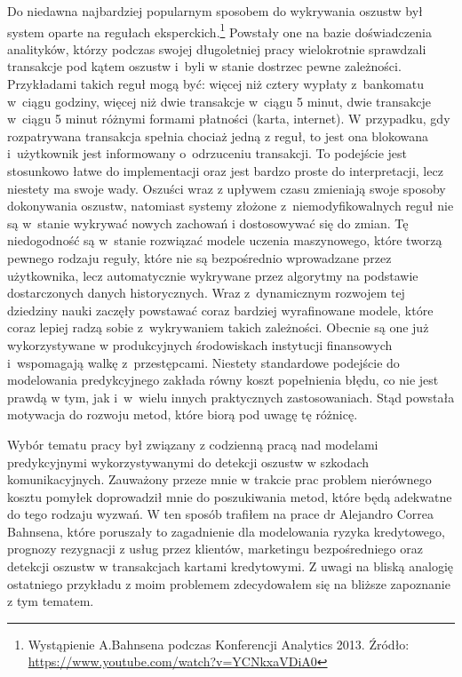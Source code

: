 \documentclass[inzynierska]{pwr_wmat_praca_dyplomowa}
\theoremstyle{plain}
\numberwithin{theorem}{chapter}
\theoremstyle{definition}
\numberwithin{theorem}{chapter}
\begin{document}
Do niedawna najbardziej popularnym sposobem do wykrywania oszustw był system oparte na regułach eksperckich.\footnote{Wystąpienie A.Bahnsena podczas Konferencji Analytics 2013. Źródło: \url{https://www.youtube.com/watch?v=YCNkxaVDiA0}} Powstały one na bazie doświadczenia analityków, którzy podczas swojej długoletniej pracy wielokrotnie sprawdzali transakcje pod kątem oszustw i~byli w stanie dostrzec pewne zależności. Przykładami takich reguł mogą być: więcej niż cztery wypłaty z~bankomatu w~ciągu godziny, więcej niż dwie transakcje w~ciągu 5 minut, dwie transakcje w~ciągu 5 minut różnymi formami płatności (karta, internet). W przypadku, gdy rozpatrywana transakcja spełnia chociaż jedną z reguł, to jest ona blokowana i~użytkownik jest informowany o~odrzuceniu transakcji. To podejście jest stosunkowo łatwe do implementacji oraz jest bardzo proste do interpretacji, lecz niestety ma swoje wady. Oszuści wraz z upływem czasu zmieniają swoje sposoby dokonywania oszustw, natomiast systemy złożone z~niemodyfikowalnych reguł nie są w~stanie wykrywać nowych zachowań i dostosowywać się do zmian. Tę niedogodność są w~stanie rozwiązać modele uczenia maszynowego, które tworzą pewnego rodzaju reguły, które nie są bezpośrednio wprowadzane przez użytkownika, lecz automatycznie wykrywane przez algorytmy na podstawie dostarczonych danych historycznych. Wraz z~dynamicznym rozwojem tej dziedziny nauki zaczęły powstawać coraz bardziej wyrafinowane modele, które coraz lepiej radzą sobie z~wykrywaniem takich zależności. Obecnie są one już wykorzystywane w produkcyjnych środowiskach instytucji finansowych i~wspomagają walkę z~przestępcami. Niestety standardowe podejście do modelowania predykcyjnego zakłada równy koszt popełnienia błędu, co nie jest prawdą w tym, jak i~w~wielu innych praktycznych zastosowaniach. Stąd powstała motywacja do rozwoju metod, które biorą pod uwagę tę różnicę.

Wybór tematu pracy był związany z codzienną pracą nad modelami predykcyjnymi wykorzystywanymi do detekcji oszustw w szkodach komunikacyjnych. Zauważony przeze mnie w trakcie prac problem nierównego kosztu pomyłek doprowadził mnie do poszukiwania metod, które będą adekwatne do tego rodzaju wyzwań. W ten sposób trafiłem na prace dr Alejandro Correa Bahnsena, które poruszały to zagadnienie dla modelowania ryzyka kredytowego, prognozy rezygnacji z usług przez klientów, marketingu bezpośredniego oraz detekcji oszustw w transakcjach kartami kredytowymi. Z uwagi na bliską analogię ostatniego przykładu z moim problemem zdecydowałem się na bliższe zapoznanie z tym tematem.
\end{document}
